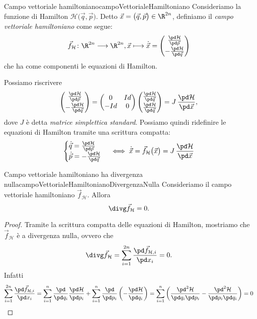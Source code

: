 \begin{defn}{Campo vettoriale hamiltoniano}{campoVettorialeHamiltoniano}
	Consideriamo la funzione di Hamilton \(\mathcal{H}\big(\vec{q},\vec{p}\big)\). Detto \(\vec{x}=\big(\vec{q},\vec{p}\big)\in\R^{2n}\), definiamo il \emph{campo vettoriale hamiltoniano} come segue:
	\[
		\vec{f}_{\mathcal{H}} \colon \R^{2n} \longrightarrow \R^{2n}, \vec{x} \longmapsto \dot{\vec{x}} =  \begin{pmatrix}
			\frac{\pd\mathcal{H}}{\pd\vec{p}} \\[0.3em]
			-\frac{\pd\mathcal{H}}{\pd\vec{q}}
		\end{pmatrix}
	\]
	che ha come componenti le equazioni di Hamilton.
\end{defn}

\begin{oss}\label{df:matriceSimpletticaStandard}
	Possiamo riscrivere
	\[
		\begin{pmatrix}
			\frac{\pd\mathcal{H}}{\pd\vec{p}} \\[0.3em]
			-\frac{\pd\mathcal{H}}{\pd\vec{q}}
		\end{pmatrix} =
		\begin{pmatrix}
			0   & Id \\
			-Id & 0
		\end{pmatrix}
		\begin{pmatrix}
			\frac{\pd\mathcal{H}}{\pd\vec{q}} \\[0.3em]
			\frac{\pd\mathcal{H}}{\pd\vec{q}}
		\end{pmatrix}
		= J\,\frac{\pd\mathcal{H}}{\pd\vec{x}},
	\]
	dove \(J\) è detta \emph{matrice simplettica standard}. Possiamo quindi ridefinire le equazioni di Hamilton tramite una scrittura compatta:
	\[
		\begin{cases}
			\dot{\vec{q}} = \frac{\pd\mathcal{H}}{\pd\vec{p}} \\
			\dot{\vec{p}} = -\frac{\pd\mathcal{H}}{\pd\vec{q}}
		\end{cases}
		\iff \dot{\vec{x}} = \vec{f}_{\mathcal{H}}\big(\vec{x}\big) = J\,\frac{\pd\mathcal{H}}{\pd\vec{x}}
	\]
\end{oss}

\begin{prop}{Campo vettoriale hamiltoniano ha divergenza nulla}{campoVettorialeHamiltonianoDivergenzaNulla}
	Consideriamo il campo vettoriale hamiltoniano \(\vec{f}_{\mathcal{H}}\). Allora
	\[
		\divg\vec{f}_{\mathcal{H}} = 0.
	\]
\end{prop}

\begin{proof}
	Tramite la scrittura compatta delle equazioni di Hamilton, mostriamo che \(\vec{f}_{\mathcal{H}}\) è a divergenza nulla, ovvero che
	\[
		\divg \vec{f}_{\mathcal{H}} = \sum_{i=1}^{2n} \frac{\pd\vec{f}_{\mathcal{H},i}}{\pd x_i} = 0.
	\]
	Infatti
	\[
		\sum_{i=1}^{2n} \frac{\pd\vec{f}_{\mathcal{H},i}}{\pd x_i} = \sum_{i=1}^n \frac{\pd}{\pd q_i} \frac{\pd\mathcal{H}}{\pd p_i} + \sum_{i=1}^n \frac{\pd}{\pd p_i} \left(-\frac{\pd\mathcal{H}}{\pd q_i}\right) = \sum_{i=1}^n \left(\frac{\pd^2\mathcal{H}}{\pd q_i\pd p_i}-\frac{\pd^2\mathcal{H}}{\pd p_i\pd q_i}\right) = 0\qedhere
	\]
\end{proof}

